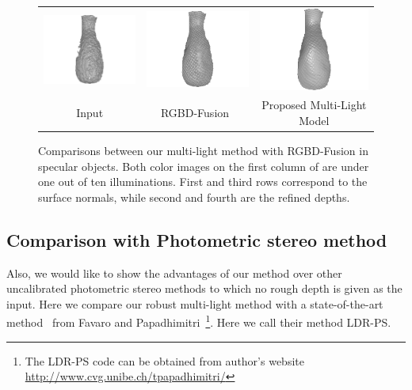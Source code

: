 \begin{figure}[!ht]
{\begin{tabular}{c|c c}
   \includegraphics[height = 0.24\linewidth]{figures/result/robust_vase_shape_init.pdf} 
   &
   \includegraphics[height = 0.24\linewidth]{figures/result/rgbd_vase_shape.pdf} &
   \includegraphics[height = 0.24\linewidth]{figures/result/robust_vase_shape.pdf}\\


   {Input} & {RGBD-Fusion~\cite{or2015rgbd}} & {Proposed Multi-Light Model}               
 \end{tabular}}
\caption{Comparisons between our multi-light method with RGBD-Fusion in specular objects. Both color images on the first column of are under one out of ten illuminations. First and third rows correspond to the surface normals, while second and fourth are the refined depths.}
\label{fig:comp_specular}
\end{figure}

\subsection{Comparison with Photometric stereo method}
Also, we would like to show the advantages of our method over other uncalibrated photometric stereo methods to which no rough depth is given as the input.
Here we compare our robust multi-light method with a state-of-the-art method~\cite{favaro2012closed} from Favaro and Papadhimitri~\footnote{The LDR-PS code can be obtained from author's website \url{http://www.cvg.unibe.ch/tpapadhimitri/}}. 
Here we call their method LDR-PS.

